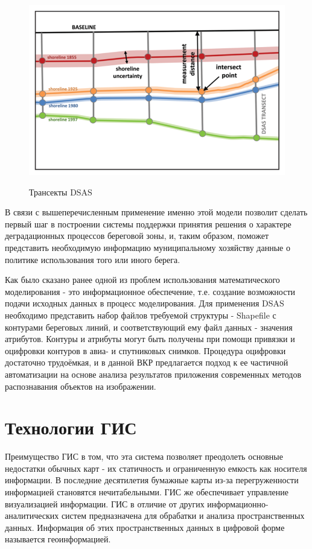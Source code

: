 \documentclass[732,14pt,final]{studrep}
\begin{document}
\begin{figure}[htp]
  \centering
  \includegraphics[width=\linewidth]{pics/image9.png}\label{fig:dsas-trans}
  \caption{Трансекты DSAS}
\end{figure}

В связи с вышеперечисленным применение именно этой модели позволит сделать первый шаг в построении системы поддержки принятия решения о характере деградационных процессов береговой зоны, и, таким образом, поможет представить необходимую информацию муниципальному хозяйству данные о политике использования того или иного берега.

Как было сказано ранее одной из проблем использования математического моделирования - это информационное обеспечение, т.е. создание возможности подачи исходных данных в процесс моделирования. Для применения DSAS необходимо представить набор файлов требуемой структуры - Shapefile с контурами береговых линий, и соответствующий ему файл данных - значения атрибутов. Контуры и атрибуты могут быть получены при помощи привязки и оцифровки контуров в авиа- и спутниковых снимков. Процедура оцифровки достаточно трудоёмкая, и в данной ВКР предлагается подход к ее частичной автоматизации на основе анализа результатов приложения современных методов распознавания объектов на изображении.

\section{Технологии ГИС}

Преимущество ГИС в том, что эта система позволяет преодолеть основные недостатки обычных карт - их статичность и ограниченную емкость как носителя информации. В последние десятилетия бумажные карты из-за перегруженности информацией становятся нечитабельными. ГИС же обеспечивает управление визуализацией информации. ГИС в отличие от других информационно-аналитических систем предназначена для обрабатки и анализа пространственных данных. Информация об этих пространственных данных в цифровой форме называется геоинформацией.
\end{document}
